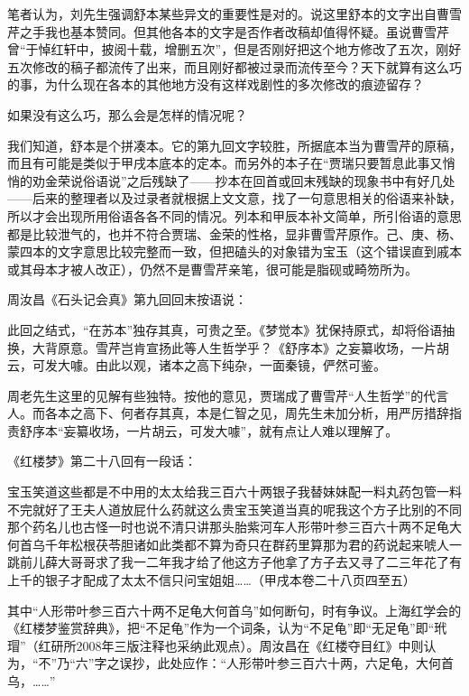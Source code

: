 笔者认为，刘先生强调舒本某些异文的重要性是对的。说这里舒本的文字出自曹雪芹之手我也基本赞同。但其他各本的文字是否作者改稿却值得怀疑。虽说曹雪芹曾``于悼红轩中，披阅十载，增删五次''，但是否刚好把这个地方修改了五次，刚好五次修改的稿子都流传了出来，而且刚好都被过录而流传至今？天下就算有这么巧的事，为什么现在各本的其他地方没有这样戏剧性的多次修改的痕迹留存？

如果没有这么巧，那么会是怎样的情况呢？

我们知道，舒本是个拼凑本。它的第九回文字较胜，所据底本当为曹雪芹的原稿，而且有可能是类似于甲戌本底本的定本。而另外的本子在``贾瑞只要暂息此事又悄悄的劝金荣说俗语说''之后残缺了------抄本在回首或回末残缺的现象书中有好几处------后来的整理者以及过录者就根据上文文意，找了一句意思相关的俗语来补缺，所以才会出现所用俗语各各不同的情况。列本和甲辰本补文简单，所引俗语的意思都是比较泄气的，也并不符合贾瑞、金荣的性格，显非曹雪芹原作。己、庚、杨、蒙四本的文字意思比较完整而一致，但把磕头的对象错为宝玉（这个错误直到戚本或其母本才被人改正），仍然不是曹雪芹亲笔，很可能是脂砚或畸笏所为。

周汝昌《石头记会真》第九回回末按语说：

此回之结式，``在苏本''独存其真，可贵之至。《梦觉本》犹保持原式，却将俗语抽换，大背原意。雪芹岂肯宣扬此等人生哲学乎？《舒序本》之妄纂收场，一片胡云，可发大噱。由此以观，诸本之高下纯杂，一面秦镜，俨然可鉴。

周老先生这里的见解有些独特。按他的意见，贾瑞成了曹雪芹``人生哲学''的代言人。而各本之高下、何者存其真，本是仁智之见，周先生未加分析，用严厉措辞指责舒序本``妄纂收场，一片胡云，可发大噱''，就有点让人难以理解了。

{}

《红楼梦》第二十八回有一段话：

宝玉笑道这些都是不中用的太太给我三百六十两银子我替妹妹配一料丸药包管一料不完就好了王夫人道放屁什么药就这么贵宝玉笑道当真的呢我这个方子比别的不同那个药名儿也古怪一时也说不清只讲那头胎紫河车人形带叶参三百六十两不足龟大何首乌千年松根茯苓胆诸如此类都不算为奇只在群药里算那为君的药说起来唬人一跳前儿薛大哥哥求了我一二年我才给了他这方子他拿了方子去又寻了二三年花了有上千的银子才配成了太太不信只问宝姐姐\ldots{}\ldots{}（甲戌本卷二十八页四至五）

其中``人形带叶参三百六十两不足龟大何首乌''如何断句，时有争议。上海红学会的《红楼梦鉴赏辞典》，把``不足龟''作为一个词条，认为``不足龟''即``无足龟''即``玳瑁''（红研所2008年三版注释也采纳此观点）。周汝昌在《红楼夺目红》中则认为，``不''乃``六''字之误抄，此处应作：``人形带叶参三百六十两，六足龟，大何首乌，\ldots{}\ldots{}''

